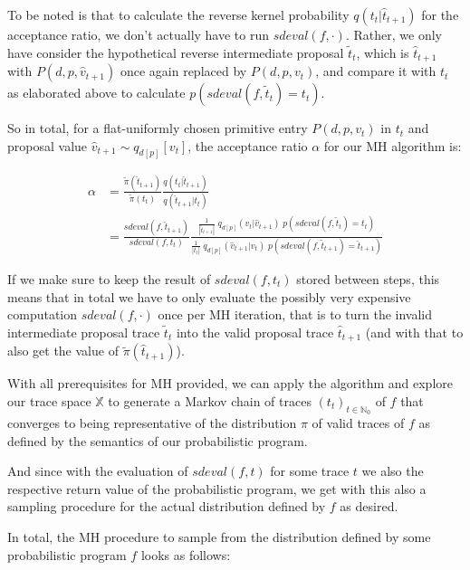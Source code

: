 To be noted is that to calculate the reverse kernel probability $q(t_t | \hat{t}_{t+1})$ for the acceptance ratio, we don't actually have to run $sdeval(f,\cdot)$. Rather, we only have consider the hypothetical reverse intermediate proposal $\tilde{t}_t$, which is $\hat{t}_{t+1}$ with $P(d,p,\hat{v}_{t+1})$ once again replaced by $P(d,p,v_t)$, and compare it with $t_t$ as elaborated above to calculate $p(sdeval(f,\tilde{t}_t) = t_t)$.

So in total, for a flat-uniformly chosen primitive entry $P(d,p,v_t)$ in $t_t$ and proposal value $\hat{v}_{t+1} \sim q_{d[p]}[v_t]$, the acceptance ratio $\alpha$ for our MH algorithm is:

\begin{align*}
\alpha &= \frac{\tilde{\pi}(\hat{t}_{t+1})}
               {\tilde{\pi}(t_t)}
          \frac{q(t_t | \hat{t}_{t+1})}
               {q(\hat{t}_{t+1} | t_t)}\\
       &= \frac{sdeval(f, \hat{t}_{t+1})}
               {sdeval(f, t_t)}
          \frac{\frac{1}{|\hat{t}_{t+1}|} \; q_{d[p]}(v_t | \hat{v}_{t+1}) \; p(sdeval(f,\tilde{t}_t) = t_t)}
               {\frac{1}{|t_t|} \; q_{d[p]}(\hat{v}_{t+1} | v_t) \; p(sdeval(f,\tilde{t}_{t+1}) = \hat{t}_{t+1})}
\end{align*}

If we make sure to keep the result of $sdeval(f, t_t)$ stored between steps, this means that in total we have to only evaluate the possibly very expensive computation $sdeval(f, \cdot)$ once per MH iteration, that is to turn the invalid intermediate proposal trace $\tilde{t}_t$ into the valid proposal trace $\hat{t}_{t+1}$ (and with that to also get the value of $\tilde{\pi}(\hat{t}_{t+1})$).

With all prerequisites for MH provided, we can apply the algorithm and explore our trace space $\mathbb{X}$ to generate a Markov chain of traces $(t_t)_{t \in \mathbb{N}_0}$ of $f$ that converges to being representative of the distribution $\pi$ of valid traces of $f$ as defined by the semantics of our probabilistic program.

And since with the evaluation of $sdeval(f,t)$ for some trace $t$ we also the respective return value of the probabilistic program, we get with this also a sampling procedure for the actual distribution defined by $f$ as desired.

In total, the MH procedure to sample from the distribution defined by some probabilistic program $f$ looks as follows:

